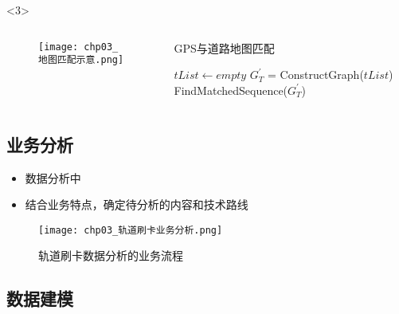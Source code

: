 \begin{frame}[t,fragile]{\subsecname}
\begin{overlayarea}{\textwidth}{\textheight}
  \begin{onlyenv}<3>
\begin{columns}
  \begin{column}{.4\textwidth}
\begin{figure}
  \centering
  \texttt{[image: chp03\_地图匹配示意.png]}
\end{figure}
  \end{column}
  \begin{column}{.6\textwidth}
\begin{algorithm}[H] \tiny
     \caption*{GPS与道路地图匹配}
     \BlankLine    
     $tList \leftarrow empty$\; 
     $G_T^{\prime}$ = ConstructGraph($tList$)
     \Return FindMatchedSequence($G_T^{\prime}$)\;
\end{algorithm}
  \end{column}
\end{columns}
  \end{onlyenv}
\end{overlayarea}
\end{frame}

\subsection{业务分析}

\begin{frame}[t]{\subsecname}
\begin{itemize}
\item 数据分析中
\item 结合业务特点，确定待分析的内容和技术路线
\end{itemize}

\begin{figure}
  \centering
  \texttt{[image: chp03\_轨道刷卡业务分析.png]}
  \caption{轨道刷卡数据分析的业务流程}
\end{figure}
\end{frame}

\subsection{数据建模}


